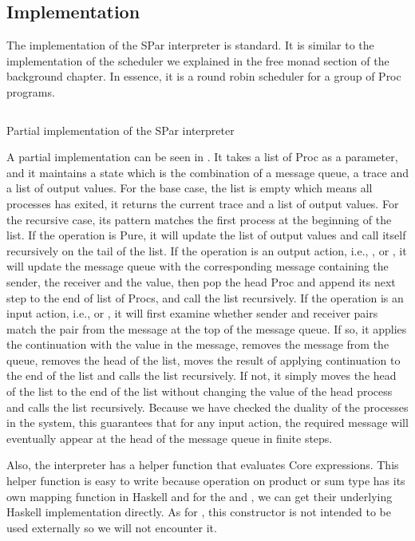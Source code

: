 \subsection{Implementation}
The implementation of the SPar interpreter is standard. It is similar to the implementation of the scheduler we explained in the free monad section of the background chapter. In essence, it is a round robin scheduler for a group of Proc programs. 

\begin{listing}[ht]
\inputminted{Haskell}{impl/interp.hs}
\caption{Partial implementation of the SPar interpreter} 
\label{impl:code:interp} %
\end{listing}

A partial implementation can be seen in . It takes a list of Proc as a parameter, and it maintains a state which is the combination of a message queue, a trace and a list of output values. For the base case, the list is empty which means all processes has exited, it returns the current trace and a list of output values. For the recursive case, its pattern matches the first process at the beginning of the list. If the operation is Pure, it will update the list of output values and call itself recursively on the tail of the list. If the operation is an output action, i.e., ,  or , it will update the message queue with the corresponding message containing the sender, the receiver and the value, then pop the head Proc and append its next step to the end of list of Procs, and call the list recursively. If the operation is an input action, i.e.,  or , it will first examine whether sender and receiver pairs match the pair from the message at the top of the message queue. If so, it applies the continuation with the value in the message, removes the message from the queue, removes the head of the list, moves the result of applying continuation to the end of the list and calls the list recursively. If not, it simply moves the head of the list to the end of the list without changing the value of the head process and calls the list recursively. Because we have checked the duality of the processes in the system, this guarantees that for any input action, the required message will eventually appear at the head of the message queue in finite steps.

Also, the interpreter has a helper function that evaluates Core expressions. This helper function is easy to write because operation on product or sum type has its own mapping function in Haskell and for the  and , we can get their underlying Haskell implementation directly. As for , this constructor is not intended to be used externally so we will not encounter it.